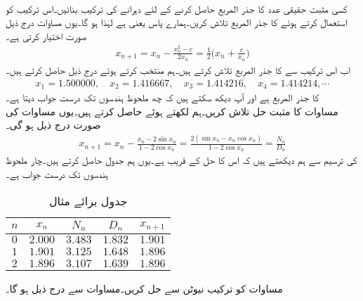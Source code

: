\quad {}\\
کسی مثبت حقیقی عدد  کا جذر المربع حاصل کرنے کے لئے دہرانے کی ترکیب بنائیں۔اس ترکیب کو استعمال کرتے ہوئے  کا جذر المربع تلاش کریں۔ہمارے پاس   یعنی  ہے لہٰذا  ہو گا۔یوں مساوات  درج ذیل صورت اختیار کرتی ہے۔
\begin{align*}
x_{n+1}=x_n-\frac{x_n^2-c}{2x_n}=\frac{1}{2}\big(x_n+\frac{c}{x_n}\big)
\end{align*}
اب اس ترکیب سے  کا جذر المربع تلاش کرتے ہیں۔ہم  منتخب کرتے ہوئے درج ذیل حاصل کرتے ہیں۔
\begin{align*}
x_1=\num{1.500000},\quad x_2=\num{1.416667},\quad x_3=\num{1.414216},\quad x_4=\num{1.414214},\cdots
\end{align*}
 کا جذر المربع  ہے اور آپ دیکھ سکتے ہیں کہ  چھ ملحوظ ہندسوں تک درست جواب دیتا ہے۔
\quad {}\\
مساوات  کا مثبت حل تلاش کریں۔ہم  لکھتے ہوئے  حاصل کرتے ہیں۔یوں مساوات  کی صورت درج ذیل ہو گی۔
\begin{align*}
x_{n+1}=x_n-\frac{x_n-2\sin x_n}{1-2\cos x_n}=\frac{2(\sin x_n-x_n\cos x_n)}{1-2\cos x_n}=\frac{N_n}{D_n}
\end{align*}
 کی ترسیم سے ہم دیکھتے ہیں کہ اس کا حل  کے قریب ہے۔یوں ہم جدول  حاصل کرتے ہیں۔چار ملحوظ ہندسوں تک درست جواب  ہے۔
\begin{table}
\caption{جدول برائے مثال }
\label{جدول_مثال_اعدادی_ماورائی_الف}
\centering
\begin{tabular}{c|cccc}
$n$& $x_n$& $N_n$ &$D_n$  & $x_{n+1}$\\
\hline
$0$& $2.000$& $3.483$ & $1.832$ & $1.901$\\
$1$& $1.901$ & $3.125$ & $1.648$ & $1.896$\\
$2$& $1.896$ & $3.107$ & $1.639$ & $1.896$
\end{tabular}
\end{table}
\quad {}
مساوات  کو ترکیب نیوٹن سے حل کریں۔مساوات  سے درج ذیل ہو گا۔
